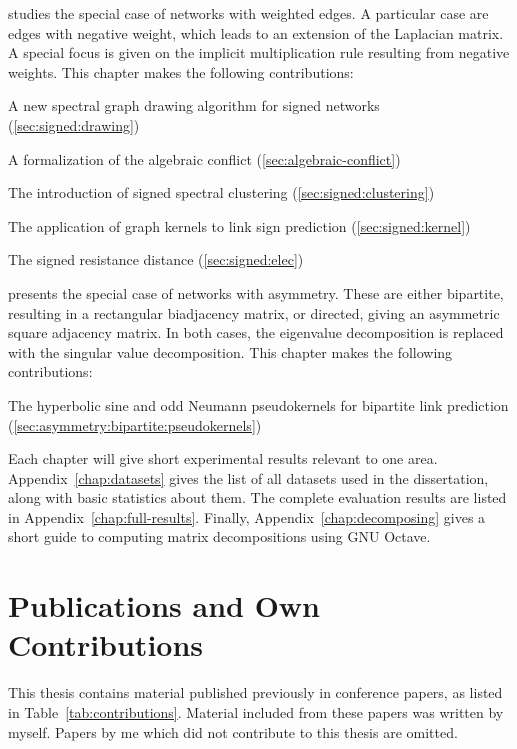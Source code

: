 \documentclass[11pt,a4paper]{book}
\newenvironment{itemize*}%
  {\begin{itemize}%
    \setlength{\itemsep}{0pt}%
    \setlength{\parskip}{0pt}}%
  {\end{itemize}}
\begin{document}
\begin{description}[leftmargin=2.15cm]
\item[Chapter~\ref{chap:signed}] studies the special case of networks with
weighted edges.  A particular case are edges with negative weight,
which leads to an extension of the Laplacian matrix.  A
special focus is given on the implicit multiplication rule resulting
from negative weights. 
This chapter makes the following contributions:
\begin{itemize*}
\item A new spectral graph drawing algorithm for signed networks
  (\ref{sec:signed:drawing}) 
\item A formalization of the algebraic conflict (\ref{sec:algebraic-conflict})
\item The introduction of signed spectral clustering
  (\ref{sec:signed:clustering}) 
\item The application of graph kernels to link sign prediction
  (\ref{sec:signed:kernel}) 
\item The signed resistance distance (\ref{sec:signed:elec}) 
\end{itemize*}

\item[Chapter~\ref{chap:asymmetry}] presents the special case of networks with
asymmetry.  These are either bipartite, resulting in a rectangular
biadjacency matrix, or directed, giving an asymmetric square adjacency
matrix.  In both cases, the eigenvalue decomposition is replaced with
the singular value decomposition. 
This chapter makes the following contributions:
\begin{itemize*}
\item The hyperbolic sine and odd Neumann pseudokernels for bipartite
  link prediction (\ref{sec:asymmetry:bipartite:pseudokernels})
\end{itemize*}

\end{description}

Each chapter will give short experimental results relevant to one area.
Appendix~\ref{chap:datasets} gives the list of all datasets used in the
dissertation, along with basic statistics about them. 
The complete evaluation results are listed in
Appendix~\ref{chap:full-results}.  
Finally, Appendix~\ref{chap:decomposing} gives a short guide to
computing matrix decompositions using GNU Octave. 

\section{Publications and Own Contributions}
This thesis contains material published previously in conference
papers, as listed in Table~\ref{tab:contributions}.  Material included
from these papers was written by myself.  Papers by me which did not
contribute to this thesis are omitted. 
\end{document}

